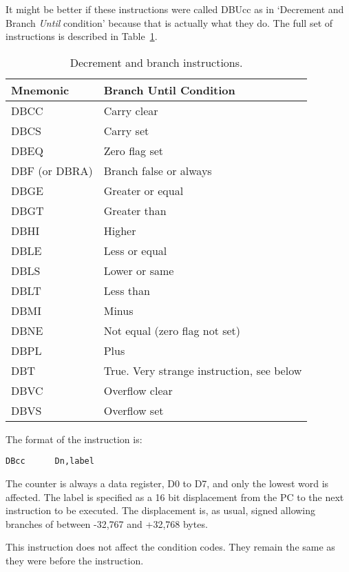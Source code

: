 It might be better if these instructions were called DBUcc as in
    `Decrement and Branch \emph{Until} condition' because that is actually what they
    do. The full set of  instructions is described in Table~\ref{tab:DecrementAndBranchInstructions}.

\begin{table}[htbp]
\centering
\begin{tabular}{l l}
\toprule
\textbf{Mnemonic} & \textbf{Branch Until Condition}\\
\midrule
DBCC & Carry clear\\
DBCS & Carry set\\
DBEQ & Zero flag set\\
DBF (or DBRA) & Branch false or always\\
DBGE & Greater or equal\\
DBGT & Greater than\\
DBHI & Higher\\
DBLE & Less or equal\\
DBLS & Lower or same\\
DBLT & Less than\\
DBMI & Minus\\
DBNE & Not equal (zero flag not set)\\
DBPL & Plus\\
DBT & True. Very strange instruction, see below\\
DBVC & Overflow clear\\
DBVS & Overflow set\\
\bottomrule
\end{tabular}
\caption{Decrement and branch instructions.}
\label{tab:DecrementAndBranchInstructions}
\end{table}

The format of the instruction is:

\begin{lstlisting}[firstnumber=1,]
          DBcc      Dn,label
\end{lstlisting}

The counter is always a data register, D0 to D7, and only the lowest
    word is affected. The label is specified as a 16 bit displacement from the
    PC to the next instruction to be executed. The displacement is, as usual,
    signed allowing branches of between -{}32,767 and +32,768 bytes.

This instruction does not affect the condition codes. They remain
    the same as they were before the instruction.

